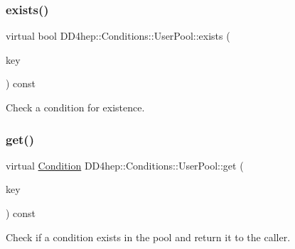 \hypertarget{class_d_d4hep_1_1_conditions_1_1_user_pool_af61d57de60db641dc8db117e2a03d3d7}{}\label{class_d_d4hep_1_1_conditions_1_1_user_pool_af61d57de60db641dc8db117e2a03d3d7} 
\subsubsection{\texorpdfstring{exists()}{exists()}\hspace{0.1cm}{\footnotesize\ttfamily [2/2]}}
{\footnotesize\ttfamily virtual bool D\+D4hep\+::\+Conditions\+::\+User\+Pool\+::exists (\begin{DoxyParamCaption}\item[{const \hyperlink{class_d_d4hep_1_1_conditions_1_1_condition_key}{Condition\+Key} \&}]{key }\end{DoxyParamCaption}) const\hspace{0.3cm}{\ttfamily [pure virtual]}}



Check a condition for existence. 

\hypertarget{class_d_d4hep_1_1_conditions_1_1_user_pool_ad02d5ac6dfb83a6c9fa2b7a891ecde08}{}\label{class_d_d4hep_1_1_conditions_1_1_user_pool_ad02d5ac6dfb83a6c9fa2b7a891ecde08} 
\subsubsection{\texorpdfstring{get()}{get()}\hspace{0.1cm}{\footnotesize\ttfamily [1/2]}}
{\footnotesize\ttfamily virtual \hyperlink{class_d_d4hep_1_1_conditions_1_1_condition}{Condition} D\+D4hep\+::\+Conditions\+::\+User\+Pool\+::get (\begin{DoxyParamCaption}\item[{\hyperlink{class_d_d4hep_1_1_conditions_1_1_user_pool_aa256cf1e22de1b9f2a84d39309b8bfa9}{key\+\_\+type}}]{key }\end{DoxyParamCaption}) const\hspace{0.3cm}{\ttfamily [pure virtual]}}



Check if a condition exists in the pool and return it to the caller. 



